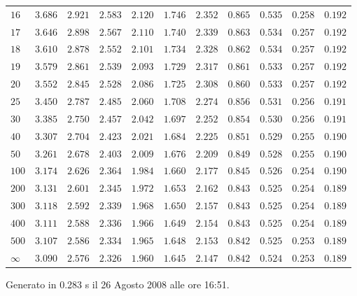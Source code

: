 \begin{table}[htb!]
\begin{center}
{\begin{tabular}{p{22 pt}cccccccccc}
$16$ & $3.686$ & $2.921$ & $2.583$ & $2.120$ & $1.746$ & $2.352$ & $0.865$ & $0.535$ & $0.258$ & $0.192$\\
$17$ & $3.646$ & $2.898$ & $2.567$ & $2.110$ & $1.740$ & $2.339$ & $0.863$ & $0.534$ & $0.257$ & $0.192$\\
$18$ & $3.610$ & $2.878$ & $2.552$ & $2.101$ & $1.734$ & $2.328$ & $0.862$ & $0.534$ & $0.257$ & $0.192$\\
$19$ & $3.579$ & $2.861$ & $2.539$ & $2.093$ & $1.729$ & $2.317$ & $0.861$ & $0.533$ & $0.257$ & $0.192$\\
$20$ & $3.552$ & $2.845$ & $2.528$ & $2.086$ & $1.725$ & $2.308$ & $0.860$ & $0.533$ & $0.257$ & $0.192$\\
$25$ & $3.450$ & $2.787$ & $2.485$ & $2.060$ & $1.708$ & $2.274$ & $0.856$ & $0.531$ & $0.256$ & $0.191$\\
$30$ & $3.385$ & $2.750$ & $2.457$ & $2.042$ & $1.697$ & $2.252$ & $0.854$ & $0.530$ & $0.256$ & $0.191$\\
$40$ & $3.307$ & $2.704$ & $2.423$ & $2.021$ & $1.684$ & $2.225$ & $0.851$ & $0.529$ & $0.255$ & $0.190$\\
$50$ & $3.261$ & $2.678$ & $2.403$ & $2.009$ & $1.676$ & $2.209$ & $0.849$ & $0.528$ & $0.255$ & $0.190$\\
$100$ & $3.174$ & $2.626$ & $2.364$ & $1.984$ & $1.660$ & $2.177$ & $0.845$ & $0.526$ & $0.254$ & $0.190$\\
$200$ & $3.131$ & $2.601$ & $2.345$ & $1.972$ & $1.653$ & $2.162$ & $0.843$ & $0.525$ & $0.254$ & $0.189$\\
$300$ & $3.118$ & $2.592$ & $2.339$ & $1.968$ & $1.650$ & $2.157$ & $0.843$ & $0.525$ & $0.254$ & $0.189$\\
$400$ & $3.111$ & $2.588$ & $2.336$ & $1.966$ & $1.649$ & $2.154$ & $0.843$ & $0.525$ & $0.254$ & $0.189$\\
$500$ & $3.107$ & $2.586$ & $2.334$ & $1.965$ & $1.648$ & $2.153$ & $0.842$ & $0.525$ & $0.253$ & $0.189$\\
$\infty$ & $3.090$ & $2.576$ & $2.326$ & $1.960$ & $1.645$ & $2.147$ & $0.842$ & $0.524$ & $0.253$ & $0.189$\\
\hline

\end{tabular}
}
\end{center}
\end{table}
\vfill
\hfill {\scriptsize Generato in 0.283 s il 26 Agosto 2008 alle ore 16:51.}
